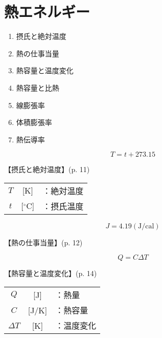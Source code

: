 \documentclass[10pt]{jarticle}
\begin{document}
\addtocounter{page}{-1}
\thispagestyle{empty}
\tableofcontents



\newpage
\addtocounter{page}{-1}
\thispagestyle{empty}
\section{熱エネルギー}


\begin{enumerate}
\small
\itemsep-4mm
\item 摂氏と絶対温度\\
\item 熱の仕事当量\\
\item 熱容量と温度変化\\
\item 熱容量と比熱\\
\item 線膨張率\\
\item 体積膨張率\\
\item 熱伝導率
\end{enumerate}


\newpage
\[
	T = t + 273.15
\]


\vskip3mm
【摂氏と絶対温度】{\footnotesize (p. 11)}

\begin{tabular}{ccl}
$T$	&[K]	&：絶対温度\\
$t$	&[$^\circ$C]	&：摂氏温度
\end{tabular}



\newpage
\[
	J =4.19 \mathrm{(J / cal)}
\]


\vskip3mm
【熱の仕事当量】{\footnotesize (p. 12)}




\newpage
\[
	Q = C \mathit{\Delta} T
\]


\vskip3mm
【熱容量と温度変化】{\footnotesize (p. 14)}

\begin{tabular}{ccl}
$Q$	&[J]	&：熱量\\
$C$	&[J/K]	&：熱容量\\
$\mathit{\Delta} T$	& [K]	&：温度変化
\end{tabular}
\end{document}
